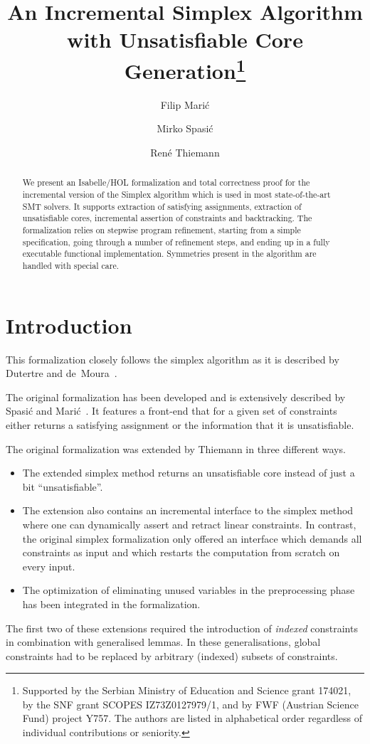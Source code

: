 \documentclass[11pt,a4paper]{article}
\begin{document}
\title{An Incremental Simplex Algorithm with Unsatisfiable Core Generation\footnote{%
Supported by the Serbian Ministry of Education and Science grant 174021, 
by the SNF grant SCOPES IZ73Z0127979/1, and
by FWF (Austrian Science Fund) project Y757.
The authors are listed in alphabetical order regardless of individual
contributions or seniority.}}
\author{Filip Mari\'c \and Mirko Spasi\'c \and Ren\'e Thiemann}

\maketitle

\begin{abstract}
We present an Isabelle/HOL formalization and total correctness
proof for the incremental version of the Simplex algorithm which is
used in most state-of-the-art SMT solvers. It supports extraction of satisfying
assignments, extraction of unsatisfiable cores, incremental assertion of constraints
and backtracking. The formalization relies on
stepwise program refinement, starting from a simple specification,
going through a number of refinement steps, and ending up in a fully
executable functional implementation. Symmetries present in the algorithm
are handled with special care. 
\end{abstract}


\tableofcontents

\section{Introduction}

This formalization closely follows the simplex algorithm as it is described by 
Dutertre and de~Moura~\cite{simplex-rad}. 

The original formalization has been developed and is extensively described 
by Spasi\'c and Mari\'c~\cite{SpasicMaric}.
It features a front-end that for a given set of constraints either returns
a satisfying assignment or the information that it is unsatisfiable.

The original formalization was extended by Thiemann in three different ways.
\begin{itemize}
\item The extended simplex method returns an unsatisfiable core instead
  of just a bit ``unsatisfiable''.
\item The extension also contains an incremental interface to the simplex
  method where one can dynamically assert and retract linear constraints.
  In contrast, the original simplex formalization only offered an 
  interface which demands all constraints as input and which restarts
  the computation from scratch on every input.
\item The optimization of eliminating unused variables in the preprocessing 
  phase~\cite[Section~3]{simplex-rad} has been integrated in the formalization.
\end{itemize}
The first two of these extensions
required the introduction of \emph{indexed} constraints in combination with
generalised lemmas. In these generalisations, global constraints had to be replaced by arbitrary (indexed) subsets of constraints. 










\end{document}

